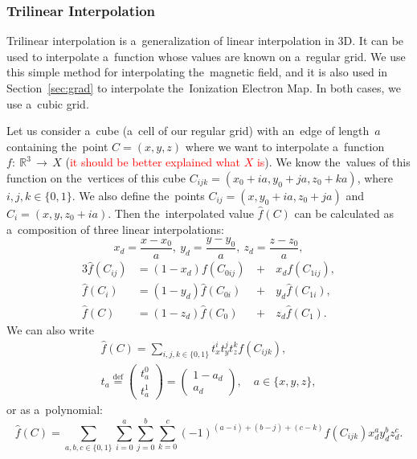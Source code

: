 			\subsubsection{Trilinear Interpolation}
			\label{sec:trilin}
				Trilinear interpolation is a~generalization of linear interpolation in 3D. It can be used to interpolate a~function whose values are known on a~regular grid. We use this simple method for interpolating the~magnetic field, and it is also used in Section~\ref{sec:grad} to interpolate the~Ionization Electron Map. In both cases, we use a~cubic grid.
				
				Let us consider a~cube (a~cell of our regular grid) with an~edge of length~$a$ containing the~point $C = (x,y,z)$ where we want to interpolate a~function $f\!\!:~\!\!\mathbb{R}^3\,\to\,X$ (\textcolor{red}{it should be better explained what $X$ is}). We know the~values of this function on the~vertices of this cube $C_{ijk} = (x_0+ia,y_0+ja,z_0+ka)$, where $i,j,k \in \{0,1\}$. We also define the~points $C_{ij} = (x,y_0+ia,z_0+ja)$ and $C_i=(x,y,z_0+ia)$. Then the~interpolated value $\widehat{f}(C)$ can be calculated as a~composition of three linear interpolations:
					\begin{equation}
						x_d = \frac{x-x_0}{a},~y_d = \frac{y-y_0}{a},~z_d = \frac{z-z_0}{a},
					\end{equation}
					\begin{alignat}{3}
						\widehat{f}(C_{ij}) &= (1-x_d)f(C_{0ij}) \,&+&\,x_d f(C_{1ij}),\\
						\widehat{f}(C_{i}) &= (1-y_d)\widehat{f}(C_{0i}) &+&\,y_d \widehat{f}(C_{1i}),\\
						\widehat{f}(C) &= (1-z_d)\widehat{f}(C_0) &+&\,z_d \widehat{f}(C_1).
					\end{alignat}
				We can also write
					\begin{eqnarray}
						\widehat{f}(C) = \sum_{i,j,k \in \{0,1\}} t_x^i t_y^j t_z^k f(C_{ijk}),\\
						t_a \stackrel{\text{def}}{=} \begin{pmatrix}t_a^0\\ t_a^1\end{pmatrix} = \begin{pmatrix}1-a_d\\ a_d\end{pmatrix},\quad a \in \{x,y,z\},
					\end{eqnarray}
				or as a~polynomial:
					\begin{equation}
						\widehat{f}(C) = \sum_{a,b,c \in \{0,1\}}\sum^{a}_{i=0}\sum^{b}_{j=0}\sum^{c}_{k=0} (-1)^{(a-i)+(b-j)+(c-k)} f(C_{ijk}) x_d^a y_d^b z_d^c.
					\end{equation}
				
